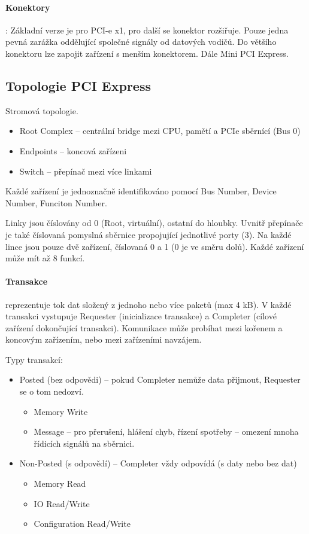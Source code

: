 \documentclass[a4paper, 11pt]{report}
\begin{document}
\paragraph{Konektory}: Základní verze je pro PCI-e x1, pro další se konektor rozšiřuje. Pouze jedna pevná zarážka oddělující společné signály od datových vodičů. Do většího konektoru lze zapojit zařízení s menším konektorem. Dále Mini PCI Express.

\subsection{Topologie PCI Express}
Stromová topologie.
\begin{itemize}
	\item Root Complex -- centrální bridge mezi CPU, pamětí a PCIe sběrnící (Bus 0)
	\item Endpoints -- koncová zařízeni
	\item Switch -- přepínač mezi více linkami
\end{itemize}
Každé zařízení je jednoznačně identifikováno pomocí Bus Number, Device Number, Funciton Number.

Linky jsou číslovány od 0 (Root, virtuální), ostatní do hloubky. Uvnitř přepínače je také číslovaná pomyslná sběrnice propojující jednotlivé porty (3). Na každé lince jsou pouze dvě zařízení, číslovaná 0 a 1 (0 je ve směru dolů). Každé zařízení může mít až 8 funkcí.

\paragraph{Transakce} reprezentuje tok dat složený z jednoho nebo více paketů (max 4 kB). V každé transakci vystupuje Requester (inicializace transakce) a Completer (cílové zařízení dokončující transakci). Komunikace může probíhat mezi kořenem a koncovým zařízením, nebo mezi zařízeními navzájem.

Typy transakcí:
\begin{itemize}
	\item Posted (bez odpovědi) -- pokud Completer nemůže data přijmout, Requester se o tom nedozví.
	\begin{itemize}
		\item Memory Write
		\item Message -- pro přerušení, hlášení chyb, řízení spotřeby -- omezení mnoha řídicích signálů na sběrnici.
	\end{itemize}
	\item Non-Posted (s odpovědí) -- Completer vždy odpovídá (s daty nebo bez dat)
	\begin{itemize}
		\item Memory Read
		\item IO Read/Write
		\item Configuration Read/Write
	\end{itemize}
\end{itemize}
\end{document}
